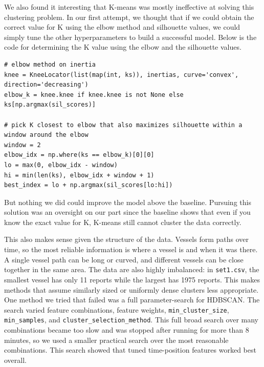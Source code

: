 \documentclass[12pt]{fphw}
\begin{document}
We also found it interesting that K-means was mostly ineffective at 
solving this clustering problem. In our first attempt, we thought that if we could obtain the correct value for K using the elbow method and silhouette values, we could simply tune the other hyperparameters to build a successful model. Below is the code for determining the K value using the elbow and the silhouette values.

\begin{lstlisting}
# elbow method on inertia
knee = KneeLocator(list(map(int, ks)), inertias, curve='convex', direction='decreasing')
elbow_k = knee.knee if knee.knee is not None else ks[np.argmax(sil_scores)]

# pick K closest to elbow that also maximizes silhouette within a window around the elbow
window = 2
elbow_idx = np.where(ks == elbow_k)[0][0]
lo = max(0, elbow_idx - window)
hi = min(len(ks), elbow_idx + window + 1)
best_index = lo + np.argmax(sil_scores[lo:hi])
\end{lstlisting}

But nothing we did could improve the model above the baseline. Pursuing this solution was an oversight on our part since the baseline
shows that even if you know the exact value for K, K-means still cannot cluster the data correctly.

This also makes sense given the structure of the data. Vessels form paths over time, so the most reliable information is where a vessel is and when it was there. A single vessel path can be long or curved, and different vessels can be close together in the same area. The data are also highly imbalanced: in \texttt{set1.csv}, the smallest vessel has only 11 reports while the largest has 1975 reports. This makes methods that assume similarly sized or uniformly dense clusters less appropriate.
One method we tried that failed was a full parameter-search for HDBSCAN. The search varied feature combinations, feature weights, \texttt{min\_cluster\_size}, \texttt{min\_samples}, and \texttt{cluster\_selection\_method}. This full broad search over many combinations became too slow and was stopped after running for more than 8 minutes, so we used a smaller practical search over the most reasonable combinations. This search showed that tuned time-position features worked best overall.
\end{document}
